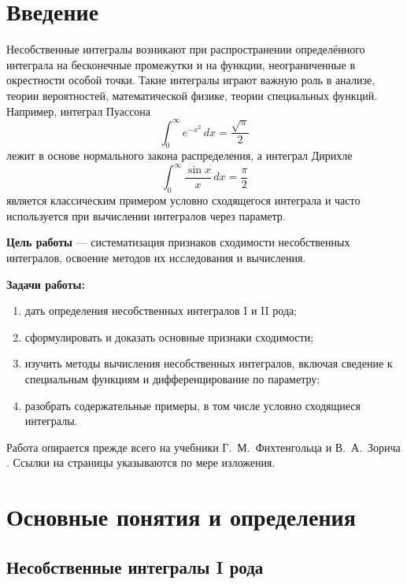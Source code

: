 \documentclass[12pt,a4paper]{article}
\theoremstyle{definition}
\theoremstyle{plain}
\theoremstyle{remark}
\begin{document}

\tableofcontents
\newpage

\section*{Введение}

Несобственные интегралы возникают при распространении определённого интеграла на бесконечные промежутки и на функции, неограниченные в окрестности особой точки. Такие интегралы играют важную роль в анализе, теории вероятностей, математической физике, теории специальных функций. Например, интеграл Пуассона
\[
\int_0^\infty e^{-x^2}\,dx=\frac{\sqrt{\pi}}{2}
\]
лежит в основе нормального закона распределения, а интеграл Дирихле
\[
\int_0^\infty \frac{\sin x}{x}\,dx=\frac{\pi}{2}
\]
является классическим примером условно сходящегося интеграла и часто используется при вычислении интегралов через параметр.

\textbf{Цель работы} — систематизация признаков сходимости несобственных интегралов, освоение методов их исследования и вычисления.

\textbf{Задачи работы:}
\begin{enumerate}[label=\arabic*)]
\item дать определения несобственных интегралов I и II рода;
\item сформулировать и доказать основные признаки сходимости;
\item изучить методы вычисления несобственных интегралов, включая сведение к специальным функциям и дифференцирование по параметру;
\item разобрать содержательные примеры, в том числе условно сходящиеся интегралы.
\end{enumerate}

Работа опирается прежде всего на учебники Г.~М.~Фихтенгольца \cite{fikht} и В.~А.~Зорича \cite{zorich}. Ссылки на страницы указываются по мере изложения.

\section{Основные понятия и определения}

\subsection{Несобственные интегралы I рода}
\label{sec:I}
\end{document}
